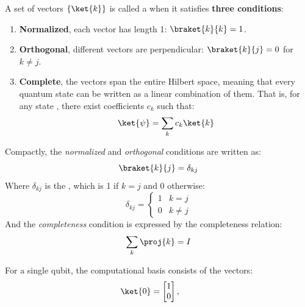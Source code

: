 \begin{deepeningbox}
    A set of vectors $\left\{\ket{k}\right\}$ is called a  when it satisfies \textbf{three conditions}:
    \begin{enumerate}
        \item \textbf{Normalized}, each vector has length 1: $\braket{k}{k} = 1$.
        \item \textbf{Orthogonal}, different vectors are perpendicular: $\braket{k}{j} = 0$ for $k \neq j$.
        \item \textbf{Complete}, the vectors span the entire Hilbert space, meaning that every quantum state can be written as a linear combination of them. That is, for any state \ket{\psi}, there exist coefficients $c_k$ such that:
        \begin{equation*}
            \ket{\psi} = \sum_k c_k \ket{k}
        \end{equation*}
    \end{enumerate}
    Compactly, the \emph{normalized} and \emph{orthogonal} conditions are written as:
    \begin{equation}\label{eq:orthonormality-relation}
        \braket{k}{j} = \delta_{kj}
    \end{equation}
    Where $\delta_{kj}$ is the , which is 1 if $k = j$ and 0 otherwise:
    \begin{equation}\label{eq:kronecker-delta}
        \delta_{kj} =
        \begin{cases}
            1 & k = j \\
            0 & k \neq j
        \end{cases}
    \end{equation}
    And the \emph{completeness} condition is expressed by the completeness relation:
    \begin{equation*}
        \sum_k \proj{k} = I
    \end{equation*}
    \begin{examplebox}
        For a single qubit, the computational basis consists of the vectors:
        \begin{equation*}
            \ket{0} =
            \begin{bmatrix}
                1 \\
                0
            \end{bmatrix},
            \qquad

\end{equation*}
\end{examplebox}
\end{deepeningbox}
